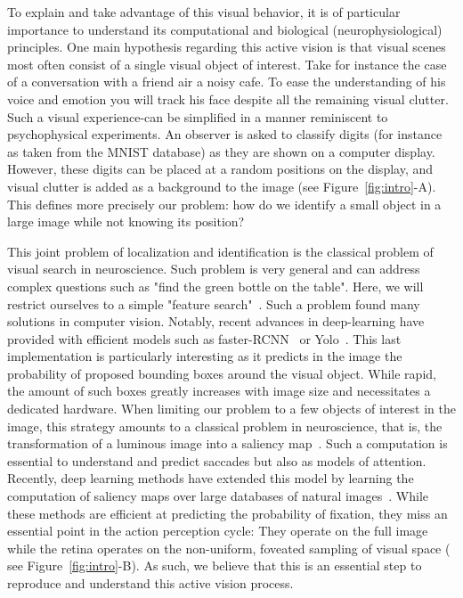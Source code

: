 To explain and take advantage of this visual behavior, it is of particular importance to understand its computational and biological (neurophysiological) principles. One main hypothesis regarding this active vision is that visual scenes most often consist of a single visual object of interest. Take for instance the case of a conversation with a friend air a noisy cafe. To ease the understanding of his voice and emotion you will track his face despite all the remaining visual clutter. Such a visual experience-can be simplified in a manner reminiscent to psychophysical experiments. An observer is asked to classify digits (for instance as taken from the MNIST database) as they are shown on a computer display. However, these digits can be placed at a random positions on the display, and visual clutter is added as a background to the image (see Figure~\ref{fig:intro}-A). This defines more precisely our problem: how do we identify a small object in a large image while not knowing its position?

This joint problem of localization and identification is the classical problem of visual search in neuroscience. Such problem is very general and can address complex questions such as "find the green bottle on the table". Here, we will restrict ourselves to a simple "feature search"~\citep{Treisman80}. Such a problem found many solutions in computer vision. Notably, recent advances in deep-learning have provided with efficient models such as faster-RCNN~\citep{Ren17} or Yolo~\citep{Redmon15}. This last implementation is particularly interesting as it predicts in the image the probability of proposed bounding boxes around the visual object. While rapid, the amount of such boxes greatly increases with image size and necessitates a dedicated hardware. When limiting our problem to a few objects of interest in the image, this strategy amounts to a classical problem in neuroscience, that is, the transformation of a luminous image into a saliency map~\citep{Itti01}. Such a computation is essential to understand and predict saccades but also as models of attention. Recently, deep learning methods have extended this  model by learning the computation of saliency maps over large databases of natural images~\citep{Kummerer16}. While these methods are efficient at predicting the probability of fixation, they miss an essential point in the action perception cycle: They operate on the full image while the retina operates on the non-uniform, foveated sampling of visual space ( see Figure~\ref{fig:intro}-B). As such, we believe that this is an essential step to reproduce and understand this active vision process.

